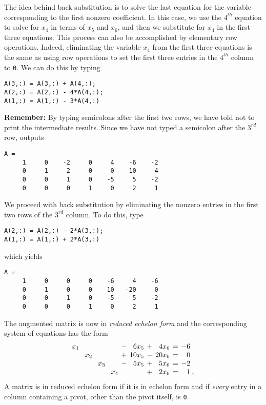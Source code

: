 The idea behind back substitution  is
to solve the last equation for the variable corresponding to the
first nonzero coefficient.  In this case, we use the $4^{th}$
equation to solve for $x_4$ in terms of $x_5$ and $x_6$, and
then we substitute for $x_4$ in the first three equations.  This
process can also be accomplished by elementary row operations.
Indeed, eliminating the variable $x_4$ from the first three
equations is the same as using row operations to set the first
three entries in the $4^{th}$ column to {\tt 0}.  We can do this
by typing
\begin{verbatim}
A(3,:) = A(3,:) + A(4,:);
A(2,:) = A(2,:) - 4*A(4,:);
A(1,:) = A(1,:) - 3*A(4,:)
\end{verbatim}
{\bf Remember:} By typing semicolons after the first two rows, we
have told \Matlab not to print the intermediate results.  Since
we have not typed a semicolon after the $3^{rd}$ row, \Matlab
outputs
\begin{verbatim}
A =
     1     0    -2     0     4    -6    -2
     0     1     2     0     0   -10    -4
     0     0     1     0    -5     5    -2
     0     0     0     1     0     2     1
\end{verbatim}
We proceed with back substitution by eliminating the nonzero
entries in the first two rows of the $3^{rd}$ column.  To do
this, type
\begin{verbatim}
A(2,:) = A(2,:) - 2*A(3,:);
A(1,:) = A(1,:) + 2*A(3,:)
\end{verbatim}
which yields
\begin{verbatim}
A =
     1     0     0     0    -6     4    -6
     0     1     0     0    10   -20     0
     0     0     1     0    -5     5    -2
     0     0     0     1     0     2     1
\end{verbatim}
The augmented matrix is now in {\em reduced echelon form}
 and the corresponding system of
equations has the form
\begin{equation}   \label{e:refexamp5}
\arraycolsep 2pt
\begin{array}{rcrcrcrcrcrcrl}
  x_1 &   &     &   &     &  &     & - &  6x_5 & + &  4x_6 & = &
-6 & \\
      &   & x_2 &   &     &  &     & + & 10x_5 & - & 20x_6 & = &
0 & \\
      &   &     &   & x_3 &  &     & - &  5x_5 & + &  5x_6 & = &
-2 & \\
      &   &     &   &     &  & x_4 &   &       & + &  2x_6 & = &
1 &\! ,
\end{array}
\end{equation}
A matrix is in reduced echelon form 
if it is in echelon form and if {\em every\/} entry in a column
containing a pivot, other than the pivot itself, is {\tt 0}.

